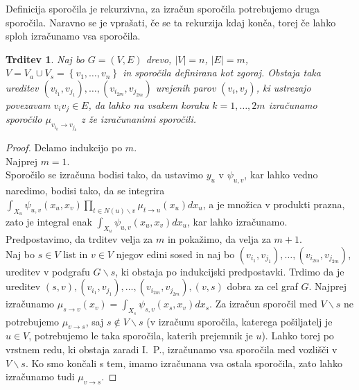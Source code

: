 \documentclass[a4paper]{article}
\newtheorem{statement}[definition]{Trditev}
\begin{document}
	Definicija sporočila je rekurzivna, za izračun sporočila potrebujemo druga
	sporočila. Naravno se je vprašati, če se ta rekurzija kdaj konča, torej
	če lahko sploh izračunamo vsa sporočila.
	\begin{statement}
		\label{sporocila_drevo}
		Naj bo $G = \left(V, E\right)$ drevo, $\left|V\right| = n$, $\left|E\right| = m$, $V = V_a \cup V_s = \left\{v_1, \ldots, v_n\right\}$
		in sporočila definirana kot zgoraj.
		Obstaja taka ureditev
		$\left(v_{i_1}, v_{j_1}\right), \ldots, \left(v_{i_{2m}}, v_{j_{2m}}\right)$ urejenih
		parov $\left(v_i, v_j\right)$, ki ustrezajo povezavam $v_iv_j \in E$,
		da lahko na vsakem koraku $k = 1, \ldots, 2m$ izračunamo sporočilo
		$\mu_{v_{i_k} \to v_{j_k}}$ z že izračunanimi sporočili.
	\end{statement}
	\begin{proof}
		Delamo indukcijo po $m$. \\
		Najprej $m = 1$. \\
		Sporočilo se izračuna bodisi tako, da
		ustavimo $y_u$ v $\psi_{u,v}$, kar lahko vedno naredimo, bodisi tako,
		da se integrira
		$\int_{X_u} \psi_{u,v}\left(x_u,x_v\right) \prod_{t\in N\left(u\right)\backslash v} \mu_{t \to u}\left(x_u\right)dx_u$,
		a je množica v produkti prazna, zato je integral enak
		$\int_{X_u} \psi_{u,v}\left(x_u,x_v\right)dx_u$,
		kar lahko izračunamo.\\
		Predpostavimo, da trditev velja za $m$ in pokažimo, da velja za $m+1$. \\
		Naj bo $s \in V$ list in $v \in V$ njegov edini sosed
		in naj bo $\left(v_{i_1}, v_{j_1}\right), \ldots, \left(v_{i_{2m}}, v_{j_{2m}}\right)$,
		ureditev v podgrafu $G\backslash s$, ki obstaja po indukcijski
		predpostavki. Trdimo da je ureditev
		$\left(s, v\right), \left(v_{i_1}, v_{j_1}\right), \ldots, \left(v_{i_{2m}}, v_{j_{2m}}\right), \left(v, s\right)$
		dobra za cel graf $G$.
		Najprej izračunamo
		$\mu_{s \to v}\left(x_v\right) = \int_{X_s} \psi_{s,v}\left(x_s,x_v\right)dx_s$.
		Za izračun sporočil med $V\backslash s$ ne potrebujemo $\mu_{v \to s}$,
		saj $s \notin V\backslash s$ (v izračunu sporočila, katerega pošiljatelj
		je $u \in V$, potrebujemo le taka sporočila, katerih prejemnik je $u$).
		Lahko torej po vrstnem redu, ki obstaja zaradi I.~P.,
		izračunamo vsa sporočila med vozlišči v $V\backslash s$.
		Ko smo končali s tem, imamo izračunana vsa ostala sporočila,
		zato lahko izračunamo tudi $\mu_{v \to s}$.

	\end{proof}
\end{document}
